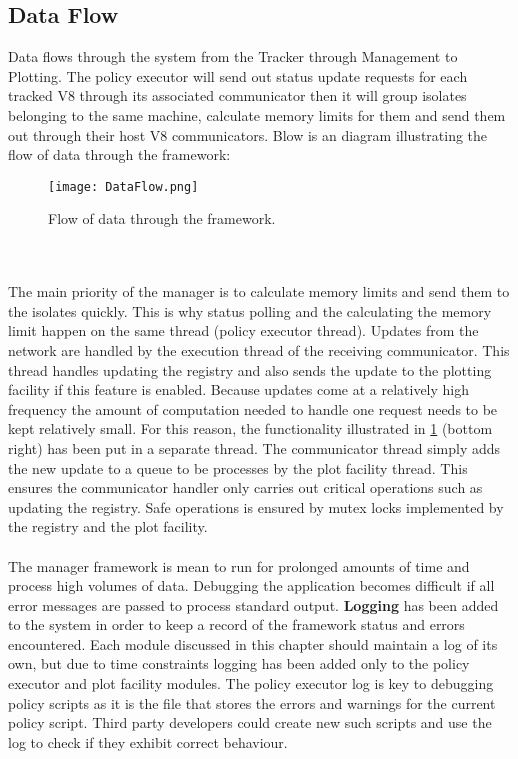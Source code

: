 \documentclass{l4proj}
\begin{document}
\subsection{Data Flow}
\hspace*{3em} Data flows through the system from the Tracker through Management to Plotting. The policy executor will send out status update requests for each tracked V8 through its associated communicator then it will group isolates belonging to the same machine, calculate memory limits for them and send them out through their host V8 communicators. Blow is an diagram illustrating the flow of data through the framework:
\begin{figure}[!ht]
  \centering
    \texttt{[image: DataFlow.png]}
  \caption{Flow of data through the framework.}
    \label{dataflow}
\end{figure}
\\\\
\hspace*{3em} The main priority of the manager is to calculate memory limits and send them to the isolates quickly. This is why status polling and the calculating the memory limit happen on the same thread (policy executor thread). Updates from the network are handled by the execution thread of the receiving communicator. This thread handles updating the registry and also sends the update to the plotting facility if this feature is enabled. Because updates come at a relatively high frequency the amount of computation needed to handle one request needs to be kept relatively small. For this reason, the functionality illustrated in \cref{dataflow} (bottom right) has been put in a separate thread. The communicator thread simply adds the new update to a queue to be processes by the plot facility thread. This ensures the communicator handler only carries out critical operations such as updating the registry. Safe operations is ensured by mutex locks implemented by the registry and the plot facility.
\\\\
\hspace*{3em} The manager framework is mean to run for prolonged amounts of time and process high volumes of data. Debugging the application becomes difficult if all error messages are passed to process standard output. \textbf{Logging} has been added to the system in order to keep a record of the framework status and errors encountered. Each module discussed in this chapter should maintain a log of its own, but due to time constraints logging has been added only to the policy executor and plot facility modules. The policy executor log is key to debugging policy scripts as it is the file that stores the errors and warnings for the current policy script. Third party developers could create new such scripts and use the log to check if they exhibit correct behaviour.
\end{document}
